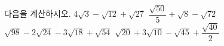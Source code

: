 다음을 계산하시오.
 $4\sqrt{3}-\sqrt{12}+\sqrt{27}$
 $\dfrac{\sqrt{50}}{5}+\sqrt{8}-\sqrt{72}$
 $\sqrt{98}-2\sqrt{24}-3\sqrt{18}+\sqrt{54}$
 $\sqrt{20}+3\sqrt{10}-\sqrt{45}+\dfrac{\sqrt{40}}{2}$
